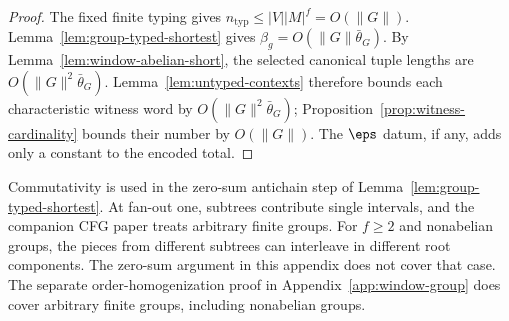 \begin{proof}
The fixed finite typing gives
$n_{\mathrm{typ}}\le|V||M|^f=O(\|G\|)$.
Lemma~\ref{lem:group-typed-shortest}
gives $\beta_g=O(\|G\|\bar\theta_G)$.
By Lemma~\ref{lem:window-abelian-short},
the selected canonical tuple lengths are
$O(\|G\|^2\bar\theta_G)$.
Lemma~\ref{lem:untyped-contexts}
therefore bounds each characteristic
witness word by $O(\|G\|^2\bar\theta_G)$;
Proposition~\ref{prop:witness-cardinality}
bounds their number by $O(\|G\|)$.
The $\eps$ datum, if any, adds only a
constant to the encoded total.
\end{proof}

\begin{remark}
Commutativity is used in the zero-sum
antichain step of
Lemma~\ref{lem:group-typed-shortest}.
At fan-out one, subtrees contribute
single intervals, and the companion CFG
paper treats arbitrary finite groups.
For $f\ge2$ and nonabelian groups,
the pieces from different subtrees can
interleave in different root components.
The zero-sum argument in this appendix does not cover
that case.  The separate order-homogenization proof in
Appendix~\ref{app:window-group} does cover arbitrary
finite groups, including nonabelian groups.
\end{remark}
